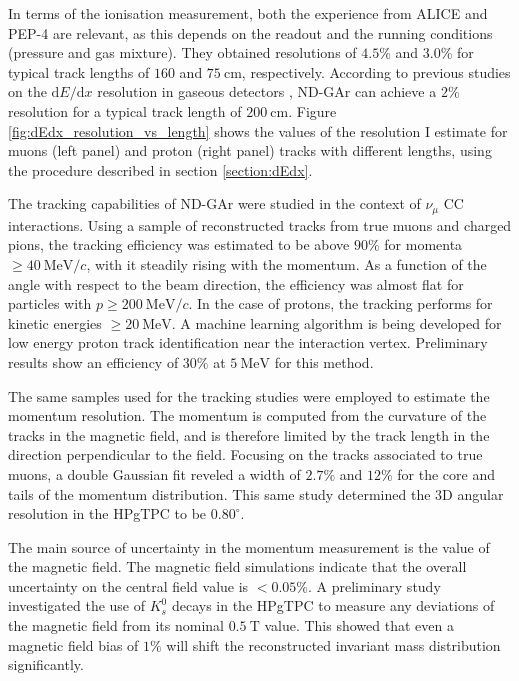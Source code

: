 In terms of the ionisation measurement, both the experience from ALICE and PEP-4 are relevant, as this depends on the readout and the running conditions (pressure and gas mixture). They obtained resolutions of $4.5\%$ and $3.0\%$ for typical track lengths of $160$ and $75~\mathrm{cm}$, respectively. According to previous studies on the $\mathrm{d}E/\mathrm{d}x$ resolution in gaseous detectors \cite{Lehraus1983}, ND-GAr can achieve a $2\%$ resolution for a typical track length of $200~\mathrm{cm}$. Figure \ref{fig:dEdx_resolution_vs_length} shows the values of the resolution I estimate for muons (left panel) and proton (right panel) tracks with different lengths, using the procedure described in section \ref{section:dEdx}.

The tracking capabilities of ND-GAr were studied in the context of $\nu_{\mu}$ CC interactions. Using a sample of reconstructed tracks from true muons and charged pions, the tracking efficiency was estimated to be above $90\%$ for momenta $\geq 40 ~ \mathrm{MeV}/c$, with it steadily rising with the momentum. As a function of the angle with respect to the beam direction, the efficiency was almost flat for particles with $p\geq 200 ~ \mathrm{MeV}/c$. In the case of protons, the tracking performs for kinetic energies $\geq 20 ~ \mathrm{MeV}$. A machine learning algorithm is being developed for low energy proton track identification near the interaction vertex. Preliminary results show an efficiency of $30\%$ at $5 ~ \mathrm{MeV}$ for this method.

The same samples used for the tracking studies were employed to estimate the momentum resolution. The momentum is computed from the curvature of the tracks in the magnetic field, and is therefore limited by the track length in the direction perpendicular to the field. Focusing on the tracks associated to true muons, a double Gaussian fit reveled a width of $2.7\%$ and $12\%$ for the core and tails of the momentum distribution. This same study determined the 3D angular resolution in the HPgTPC to be $0.80^{\circ}$.

The main source of uncertainty in the momentum measurement is the value of the magnetic field. The magnetic field simulations indicate that the overall uncertainty on the central field value is $< 0.05 \%$. A preliminary study investigated the use of $K_{s}^{0}$ decays in the HPgTPC to measure any deviations of the magnetic field from its nominal $0.5 ~ \mathrm{T}$ value. This showed that even a magnetic field bias of $1\%$ will shift the reconstructed invariant mass distribution significantly.

